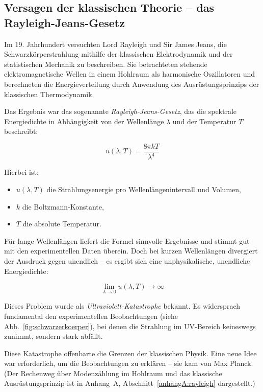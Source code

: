 \subsection{Versagen der klassischen Theorie –  das Rayleigh-Jeans-Gesetz}

Im 19. Jahrhundert versuchten Lord Rayleigh und Sir James Jeans, die Schwarzkörperstrahlung mithilfe der klassischen Elektrodynamik und der statistischen Mechanik zu beschreiben. Sie betrachteten stehende elektromagnetische Wellen in einem Hohlraum als harmonische Oszillatoren und berechneten die Energieverteilung durch Anwendung des Ausrüstungsprinzips der klassischen Thermodynamik.

Das Ergebnis war das sogenannte \emph{Rayleigh-Jeans-Gesetz}, das die spektrale Energiedichte in Abhängigkeit von der Wellenlänge \( \lambda \) und der Temperatur \( T \) beschreibt:

\[
u(\lambda, T) = \frac{8 \pi k T}{\lambda^4}
\]

Hierbei ist:
\begin{itemize}
	\item \( u(\lambda, T) \) die Strahlungsenergie pro Wellenlängenintervall und Volumen,
	\item \( k \) die Boltzmann-Konstante,
	\item \( T \) die absolute Temperatur.
\end{itemize}

Für lange Wellenlängen liefert die Formel sinnvolle Ergebnisse und stimmt gut mit den experimentellen Daten überein. Doch bei kurzen Wellenlängen divergiert der Ausdruck gegen unendlich – es ergibt sich eine unphysikalische, unendliche Energiedichte:

\[
\lim_{\lambda \to 0} u(\lambda, T) \to \infty
\]

Dieses Problem wurde als \emph{Ultraviolett-Katastrophe} bekannt. Es widersprach fundamental den experimentellen Beobachtungen (siehe Abb.~\ref{fig:schwarzerkoerper}), bei denen die Strahlung im UV-Bereich keineswegs zunimmt, sondern stark abfällt.

Diese Katastrophe offenbarte die Grenzen der klassischen Physik. Eine neue Idee war erforderlich, um die Beobachtungen zu erklären – sie kam von Max Planck.
(Der Rechenweg über Modenzählung im Hohlraum und das klassische Ausrüstungsprinzip ist in Anhang~A, Abschnitt~\ref{anhangA:rayleigh} dargestellt.)
